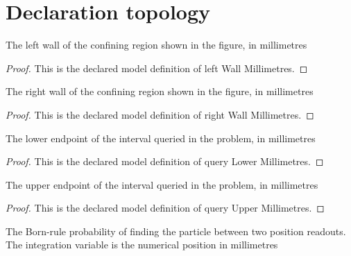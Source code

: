 \section{Declaration topology}
\begin{definition}
  \label{def:physics:phyx-mini-0506:phyxmini0506-leftwallmillimetres}
  The left wall of the confining region shown in the figure, in millimetres
\end{definition}
\begin{proof}
  This is the declared model definition of left Wall Millimetres.
\end{proof}
\begin{definition}
  \label{def:physics:phyx-mini-0506:phyxmini0506-rightwallmillimetres}
  The right wall of the confining region shown in the figure, in millimetres
\end{definition}
\begin{proof}
  This is the declared model definition of right Wall Millimetres.
\end{proof}
\begin{definition}
  \label{def:physics:phyx-mini-0506:phyxmini0506-querylowermillimetres}
  The lower endpoint of the interval queried in the problem, in millimetres
\end{definition}
\begin{proof}
  This is the declared model definition of query Lower Millimetres.
\end{proof}
\begin{definition}
  \label{def:physics:phyx-mini-0506:phyxmini0506-queryuppermillimetres}
  The upper endpoint of the interval queried in the problem, in millimetres
\end{definition}
\begin{proof}
  This is the declared model definition of query Upper Millimetres.
\end{proof}
\begin{definition}
  \label{def:physics:phyx-mini-0506:phyxmini0506-positionprobability}
  The Born-rule probability of finding the particle between two position readouts. The integration variable is the numerical position in millimetres
\end{definition}

